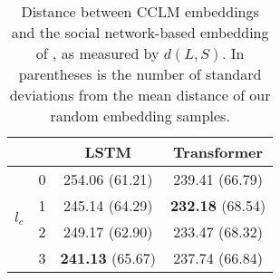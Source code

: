 \documentclass[11pt]{article}
\begin{document}
\begin{table}
\centering
\begin{tabular}{llcc}
\toprule
                        &   & LSTM     & Transformer \\
\midrule
  \multirow{4}{*}{$l_c$}  & 0 &         254.06  (61.21) &         239.41  (66.79)  \\
                          & 1 &         245.14  (64.29) & \textbf{232.18} (68.54)   \\
                          & 2 &         249.17  (62.90) &         233.47  (68.32)  \\
                          & 3 & \textbf{241.13} (65.67) &         237.74   (66.84) \\
\bottomrule
\end{tabular}
\caption{Distance between CCLM embeddings and the social network-based embedding
of \citet{Kumar2018}, as measured by $d(L,S)$. In parentheses is the number of standard deviations
from the mean distance of our random embedding samples.} \label{tab:embedding-correlations}
\end{table}






\end{document}
